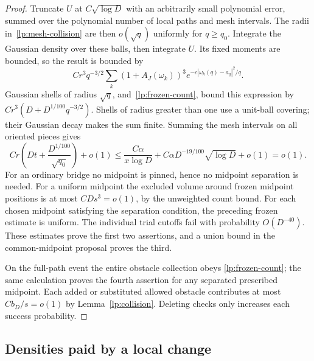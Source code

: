 \begin{proof}
Truncate $U$ at $C\sqrt{\log D}$ with an arbitrarily small polynomial
error, summed over the polynomial number of local paths and mesh
intervals.  The radii in~\eqref{lp:mesh-collision} are then
$o(\sqrt q)$ uniformly for $q\geq q_0$.  Integrate the Gaussian
density over these balls, then integrate $U$.  Its fixed moments are
bounded, so the result is bounded by
\[
 Cr^3q^{-3/2}\sum_k(1+A_J(\omega_k))^3
            e^{-c|\omega_k(q)-a_q|^2/q}.
\]
Gaussian shells of radius $\sqrt q$, and~\eqref{lp:frozen-count},
bound this expression by
$Cr^3(D+D^{1/100}q^{-3/2})$.  Shells of radius greater than one
use a unit-ball covering; their Gaussian decay makes the sum finite.
Summing the mesh intervals on all oriented pieces gives
\begin{equation}\label{lp:frozen-collision-sum}
 C r\left(Dt+\frac{D^{1/100}}{\sqrt{q_0}}\right)+o(1)
 \leq \frac{C\alpha}{x\log D}
      +C\alpha D^{-19/100}\sqrt{\log D}+o(1)=o(1).
\end{equation}
For an ordinary bridge no midpoint is pinned, hence no midpoint
separation is needed.  For a uniform midpoint the excluded volume
around frozen midpoint positions is at most $CDs^3=o(1)$, by the
unweighted count bound.  For each chosen midpoint satisfying the
separation condition, the preceding frozen estimate is uniform.
The individual trial cutoffs fail with probability $O(D^{-40})$.
These estimates prove the first two assertions, and a union bound
in the common-midpoint proposal proves the third.

On the full-path event the entire obstacle collection obeys
\eqref{lp:frozen-count}; the same calculation proves the fourth
assertion for any separated prescribed midpoint.  Each added or
substituted allowed obstacle contributes at most
$Cb_D/s=o(1)$ by Lemma~\ref{lp:collision}.  Deleting checks only
increases each success probability.
\end{proof}

\subsection{Densities paid by a local change}

